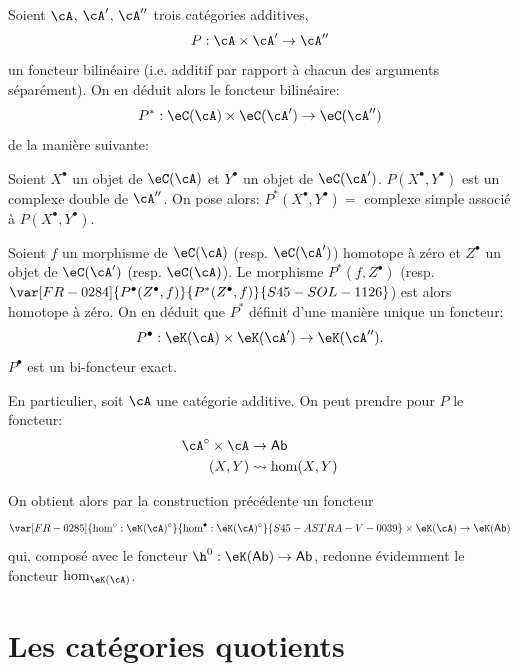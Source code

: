 Soient $\cA$, $\cA'$, $\cA''$ trois catégories additives, 
\[
  P:\cA\times \cA'\to \cA''
\]
un foncteur bilinéaire (i.e. additif par rapport à chacun des arguments 
séparément). On en déduit alors le foncteur bilinéaire: 
\[
  P^\ast:\eC(\cA)\times \eC(\cA') \to \eC(\cA'') 
\]
de la manière suivante: 

Soient $X^\bullet$ un objet de $\eC(\cA)$ et $Y^\bullet$ un objet de 
$\eC(\cA')$. $P(X^\bullet,Y^\bullet)$ est un complexe double de $\cA''$. On 
pose alors: $P^\ast(X^\bullet,Y^\bullet) = $ complexe simple associé à 
$P(X^\bullet,Y^\bullet)$. 

Soient $f$ un morphisme de $\eC(\cA)$ (resp. $\eC(\cA')$) homotope à zéro 
et $Z^\bullet$ un objet de $\eC(\cA')$ (resp. $\eC(\cA)$). Le morphisme 
$P^\ast(f,Z^\bullet)$ (resp. $\var[FR-0284]{P^\bullet(Z^\bullet,f)}{P^\ast(Z^\bullet,f)}{S45-SOL-1126}$) est alors homotope à 
zéro. On en déduit que $P^\ast$ définit d'une manière unique un 
foncteur: 
\[
  P^\bullet:\eK(\cA) \times \eK(\cA') \to \eK(\cA'') \text{.}
\]
$P^\bullet$ est un bi-foncteur exact. 

En particulier, soit $\cA$ une catégorie additive. On peut prendre pour $P$ le 
foncteur: 
\begin{align*}
  \cA^\circ\times \cA &\to \mathsf{Ab} \\
  (X,Y) &\leadsto \hom(X,Y) 
\end{align*}

On obtient alors par la construction précédente un foncteur 
\[
  \var[FR-0285]{\hom^\circ:\eK(\cA)^\circ}{\hom^\bullet:\eK(\cA)^\circ}{S45-ASTRA-V-0039} \times \eK(\cA) \to \eK(\mathsf{Ab}) 
\]
qui, composé avec le foncteur $\h^0:\eK(\mathsf{Ab})\to \mathsf{Ab}$, 
redonne évidemment le foncteur $\hom_{\eK(\cA)}$. 




















\section{Les catégories quotients}\label{VIII:2}










